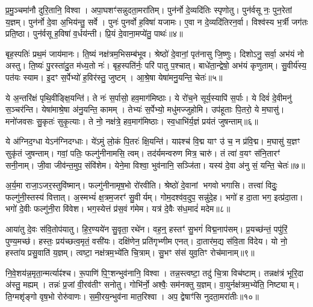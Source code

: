 प्र॒मु॒ञ्चमा॑नौ दुरि॒तानि॒ विश्वा।
अपा॒घशꣳ॑सन्नुदता॒मरा॑तिम्।
पुन॑र्नो दे॒व्यदि॑तिः स्पृणोतु।
पुन॑र्वसू नः॒ पुन॒रेतां य॒ज्ञम्।
पुन॑र्नो दे॒वा अ॒भिय॑न्तु॒ सर्वे।
पुनः॑ पुनर्वो ह॒विषा॑ यजामः।
ए॒वा न दे॒व्यदि॑तिरन॒र्वा।
विश्व॑स्य भ॒र्त्री जग॑तः प्रति॒ष्ठा।
पुन॑र्वसू ह॒विषा॑ व॒र्धय॑न्ती।
प्रि॒यं दे॒वाना॒मप्ये॑तु॒ पाथः॑॥४॥

बृह॒स्पतिः॑ प्रथ॒मं जाय॑मानः।
ति॒ष्यं नक्ष॑त्रम॒भिसम्ब॑भूव।
श्रेष्ठो॑ दे॒वानां॒ पृत॑नासु जि॒ष्णुः।
दिशोऽनु॒ सर्वा॒ अभ॑यं नो अस्तु।
ति॒ष्यः॑ पु॒रस्ता॑दु॒त म॑ध्य॒तो नः॑।
बृह॒स्पति॑र्नः॒ परि॑ पातु प॒श्चात्।
बाधे॑ता॒न्द्वेषो॒ अभ॑यं कृणुताम्।
सु॒वीर्य॑स्य॒ पत॑यः स्याम।
इ॒दꣳ स॒र्पेभ्यो॑ ह॒विर॑स्तु॒ जुष्टम्।
आ॒श्रे॒षा येषा॑मनु॒यन्ति॒ चेतः॑॥५॥

ये अ॒न्तरि॑क्षं पृथि॒वीङ्क्षि॒यन्ति॑।
ते नः॑ स॒र्पासो॒ हव॒माग॑मिष्ठाः।
ये रो॑च॒ने सूर्य॒स्यापि॑ स॒र्पाः।
ये दिवं॑ दे॒वीमनु॑ स॒ञ्चर॑न्ति।
येषा॑माश्रे॒षा अ॑नु॒यन्ति॒ कामम्।
तेभ्यः॑ स॒र्पेभ्यो॒ मधु॑मज्जुहोमि।
उप॑हूताः पि॒तरो॒ ये म॒घासु॑।
मनो॑जवसः सु॒कृतः॑ सुकृ॒त्याः।
ते नो॒ नक्ष॑त्रे॒ हव॒माग॑मिष्ठाः।
स्व॒धाभि॑र्य॒ज्ञं प्रय॑तं जुषन्ताम्॥६॥

ये अ॑ग्निद॒ग्धा येऽन॑ग्निदग्धाः।
ये॑ऽमुं लो॒कं पि॒तरः॑ क्षि॒यन्ति॑।
याꣴश्च॑ वि॒द्म याꣳ उ॑ च॒ न प्र॑वि॒द्म।
म॒घासु॑ य॒ज्ञꣳ सुकृ॑तं जुषन्ताम्।
गवां॒ पतिः॒ फल्गु॑नीनामसि॒ त्वम्।
तद॑र्यमन्वरुण मित्र॒ चारु॑।
तं त्वा॑ व॒यꣳ स॑नि॒तारꣳ॑ सनी॒नाम्।
जी॒वा जीव॑न्त॒मुप॒ संवि॑शेम।
येने॒मा विश्वा॒ भुव॑नानि॒ सञ्जि॑ता।
यस्य॑ दे॒वा अ॑नु सं॒ यन्ति॒ चेतः॑॥७॥

अ॒र्य॒मा राजा॒\-ऽजर॒स्तुवि॑ष्मान्।
फल्गु॑नीनामृष॒भो रो॑रवीति।
श्रेष्ठो॑ दे॒वानां भगवो भगासि।
तत्त्वा॑ विदुः॒ फल्गु॑नी॒स्तस्य॑ वित्तात्।
अ॒स्मभ्यं॑ क्ष॒त्रम॒जरꣳ॑ सु॒वीर्यम्।
गोम॒दश्व॑व॒दुप॒ सन्नु॑दे॒ह।
भगो॑ ह दा॒ता भग॒ इत्प्र॑दा॒ता।
भगो॑ दे॒वीः फल्गु॑नी॒रा वि॑वेश।
भग॒स्येत्तं प्र॑स॒वं ग॑मेम।
यत्र॑ दे॒वैः स॑ध॒मादं॑ मदेम॥८॥

आया॑तु दे॒वः स॑वि॒तोप॑यातु।
हि॒र॒ण्यये॑न सु॒वृता॒ रथे॑न।
वह॒न्॒ हस्तꣳ॑ सु॒भगं॑ विद्म॒नाप॑सम्।
प्र॒यच्छ॑न्तं॒ पपु॑रिं॒ पुण्य॒मच्छ॑।
हस्तः॒ प्रय॑च्छत्व॒मृतं॒ वसी॑यः।
दक्षि॑णेन॒ प्रति॑गृभ्णीम एनत्।
दा॒तार॑म॒द्य स॑वि॒ता वि॑देय।
यो नो॒ हस्ता॑य प्रसु॒वाति॑ य॒ज्ञम्।
त्वष्टा॒ नक्ष॑त्रम॒भ्ये॑ति चि॒त्राम्।
सु॒भꣳ स॑सं युव॒तिꣳ रोच॑मानाम्॥९॥

नि॒वे॒शय॑न्न॒मृता॒न्मर्त्याꣴ॑श्च।
रू॒पाणि॑ पि॒ꣳ॒शन्भुव॑नानि॒ विश्वा।
तन्न॒स्त्वष्टा॒ तदु॑ चि॒त्रा विच॑ष्टाम्।
तन्नक्ष॑त्रं भूरि॒दा अ॑स्तु॒ मह्यम्।
तन्नः॑ प्र॒जां वी॒रव॑तीꣳ सनोतु।
गोभि॑र्नो॒ अश्वैः॒ सम॑नक्तु य॒ज्ञम्।
वा॒युर्नक्ष॑त्रम॒भ्ये॑ति॒ निष्ट्याम्।
ति॒ग्मशृ॑ङ्गो वृष॒भो रोरु॑वाणः।
स॒मी॒रय॒न्भुव॑ना मात॒रिश्वा।
अप॒ द्वेषाꣳ॑सि नुदता॒मरा॑तीः॥१०॥

